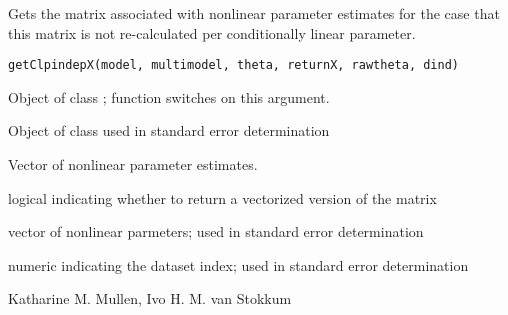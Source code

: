 \begin{Description}\relax
Gets the matrix associated with nonlinear parameter estimates for the 
case that this matrix is not re-calculated per conditionally linear
parameter.
\end{Description}
\begin{Usage}
\begin{verbatim}
getClpindepX(model, multimodel, theta, returnX, rawtheta, dind)
\end{verbatim}
\end{Usage}
\begin{Arguments}
\begin{ldescription}
\item[\code{model}] Object of class ; function switches on this 
argument. 

\item[\code{multimodel}] Object of class  used in standard error
determination
\item[\code{theta}] Vector of nonlinear parameter estimates.
\item[\code{returnX}] logical indicating whether to return a vectorized version of 
the  matrix
\item[\code{rawtheta}] vector of nonlinear parmeters; used in standard error
determination
\item[\code{dind}] numeric indicating the dataset index; used in standard error
determination
\end{ldescription}
\end{Arguments}
\begin{Author}\relax
Katharine M. Mullen, Ivo H. M. van Stokkum
\end{Author}
\begin{SeeAlso}\relax
{}
\end{SeeAlso}

